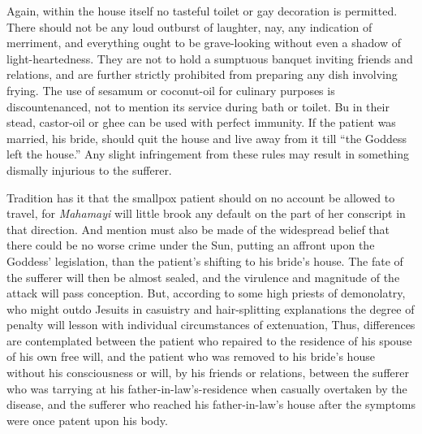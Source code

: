 \documentclass[a4paper, 12pt, oneside, english, twocolumn]{article}
\begin{document}
Again, within the house itself no tasteful toilet or gay decoration is permitted. There should not be any loud outburst of laughter, nay, any indication of merriment, and everything ought to be grave-looking without even a shadow of light-heartedness. They are not to hold a sumptuous banquet inviting friends and relations, and are further strictly prohibited from preparing any dish involving frying. The use of sesamum or coconut-oil for culinary purposes is discountenanced, not to mention its service during bath or toilet. Bu in their stead, castor-oil or ghee can be used with perfect immunity. If the patient was married, his bride, should quit the house and live away from it till ``the Goddess left the house.'' Any slight infringement from these rules may result in something dismally injurious to the sufferer.

Tradition has it that the smallpox patient should on no account be allowed to travel, for \emph{Mahamayi} will little brook any default on the part of her conscript in that direction. And mention must also be made of the widespread belief that there could be no worse crime under the Sun, putting an affront upon the Goddess' legislation, than the patient's shifting to his bride's house. The fate of the sufferer will then be almost sealed, and the virulence and magnitude of the attack will pass conception. But, according to some high priests of demonolatry, who might outdo Jesuits in casuistry and hair-splitting explanations the degree of penalty will lesson with individual circumstances of extenuation, Thus, differences are contemplated between the patient who repaired to the residence of his spouse of his own free will, and the patient who was removed to his bride's house without his consciousness or will, by his friends or relations, between the sufferer who was tarrying at his father-in-law's-residence when casually overtaken by the disease, and the sufferer who reached his father-in-law's house after the symptoms were once patent upon his body.
\end{document}

